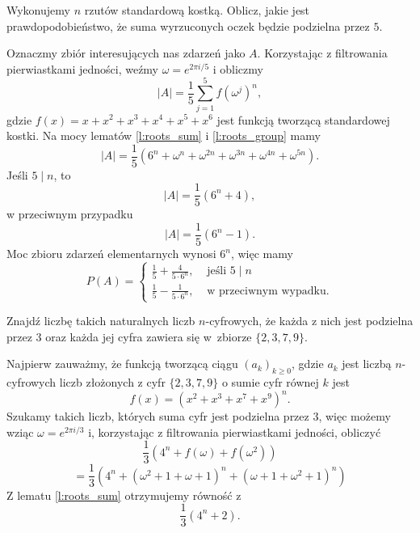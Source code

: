 \documentclass{scrartcl}
\begin{document}
    \begin{problem}[IMC 1999, B2]
        Wykonujemy $n$ rzutów standardową kostką. Oblicz, jakie jest prawdopodobieństwo, że suma wyrzuconych oczek będzie podzielna przez $5$.
        \begin{answer}
            Oznaczmy zbiór interesujących nas zdarzeń jako $A$. Korzystając z filtrowania pierwiastkami jedności, weźmy $\omega = e^{2\pi i / 5}$ i obliczmy
            $$ |A| = \frac{1}{5}\sum_{j = 1}^5 f(\omega^j)^n, $$
            gdzie $f(x) = x + x^2 + x^3 + x^4 + x^5 + x^6$ jest funkcją tworzącą standardowej kostki. Na mocy lematów \ref{l:roots_sum} i \ref{l:roots_group} mamy
            $$ |A| = \frac{1}{5}\left(6^n + \omega^n + \omega^{2n} + \omega^{3n} + \omega^{4n} + \omega^{5n}\right). $$
            Jeśli $5\mid n$, to
            $$ |A| = \frac{1}{5}\left(6^n + 4\right), $$
            w przeciwnym przypadku
            $$ |A| = \frac{1}{5}\left(6^n - 1\right). $$
            Moc zbioru zdarzeń elementarnych wynosi $6^n$, więc mamy
            $$ P(A) = \begin{cases}\frac{1}{5} + \frac{4}{5\cdot 6^n}, & \text{ jeśli } 5\mid n \\
                                   \frac{1}{5} - \frac{1}{5\cdot 6^n}, & \text{ w przeciwnym wypadku.} \end{cases} $$
        \end{answer}
    \end{problem}

    \begin{problem}
        Znajdź liczbę takich naturalnych liczb $n$-cyfrowych, że każda z nich jest podzielna przez $3$ oraz każda jej cyfra zawiera się w~zbiorze $\{2, 3, 7, 9\}$.
        \begin{answer}
            Najpierw zauważmy, że funkcją tworzącą ciągu $(a_k)_{k\geq 0}$, gdzie $a_k$ jest liczbą $n$-cyfrowych liczb złożonych z cyfr $\{2, 3, 7, 9\}$ o sumie cyfr równej $k$ jest
            $$ f(x) = \left(x^2 + x^3 + x^7 + x^9\right)^n. $$
            Szukamy takich liczb, których suma cyfr jest podzielna przez $3$, więc możemy wziąc $\omega = e^{2\pi i / 3}$ i, korzystając z filtrowania pierwiastkami jedności, obliczyć
            $$ \frac{1}{3}\left(4^n + f(\omega) + f(\omega^2)\right) $$
            $$ = \frac{1}{3}\left(4^n + \left(\omega^2 + 1 + \omega + 1\right)^n + \left(\omega + 1 + \omega^2 + 1\right)^n\right) $$
            Z lematu \ref{l:roots_sum} otrzymujemy równość z
            $$ \frac{1}{3}\left(4^n + 2\right). $$
        \end{answer}
    \end{problem}
\end{document}
